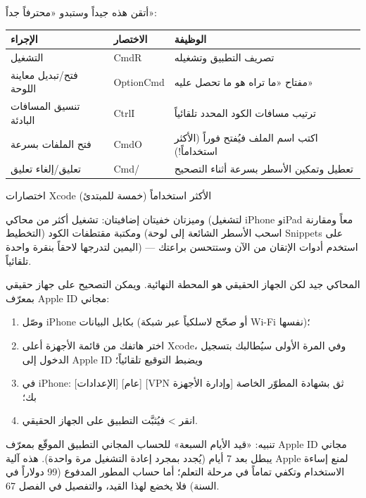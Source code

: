 

أتقن هذه جيداً وستبدو «محترفاً جداً»:

\begin{center}
\begin{tabularx}{\linewidth}{|X|X|X|}
\hline
\textbf{الإجراء} & \textbf{الاختصار} & \textbf{الوظيفة} \tabularnewline
\hline
التشغيل & CmdR & تصريف التطبيق وتشغيله \tabularnewline
فتح/تبديل معاينة اللوحة & OptionCmd & مفتاح «ما تراه هو ما تحصل عليه» \tabularnewline
تنسيق المسافات البادئة & CtrlI & ترتيب مسافات الكود المحدد تلقائياً \tabularnewline
فتح الملفات بسرعة & CmdO & اكتب اسم الملف فيُفتح فوراً (الأكثر استخداماً!) \tabularnewline
تعليق/إلغاء تعليق & Cmd/ & تعطيل وتمكين الأسطر بسرعة أثناء التصحيح \tabularnewline
\hline
\end{tabularx}
\end{center}

\begin{center}\small\color{gray}اختصارات Xcode الأكثر استخداماً (خمسة للمبتدئ)\end{center}

وميزتان خفيتان إضافيتان: تشغيل أكثر من محاكي (لتشغيل iPhone وiPad معاً ومقارنة التخطيط) ومكتبة مقتطفات الكود (اسحب الأسطر الشائعة إلى لوحة Snippets على اليمين لتدرجها لاحقاً بنقرة واحدة) — استخدم أدوات الإتقان من الآن وستتحسن براعتك تلقائياً.


المحاكي جيد لكن الجهاز الحقيقي هو المحطة النهائية. ويمكن التصحيح على جهاز حقيقي بمعرّف Apple ID مجاني:

\begin{enumerate}
  \item وصّل iPhone بكابل البيانات (أو صحّح لاسلكياً عبر شبكة Wi-Fi نفسها)؛
  \item اختر هاتفك من قائمة الأجهزة أعلى Xcode، وفي المرة الأولى سيُطالبك بتسجيل الدخول إلى Apple ID ويضبط التوقيع تلقائياً؛
  \item في iPhone: [الإعدادات] [عام] [VPN وإدارة الأجهزة] ثق بشهادة المطوّر الخاصة بك؛
  \item انقر > فيُثبَّت التطبيق على الجهاز الحقيقي.
\end{enumerate}

\begin{tcbwarn}{تنبيه: «قيد الأيام السبعة» للحساب المجاني}
التطبيق الموقّع بمعرّف Apple ID مجاني يبطل بعد 7 أيام (يُجدد بمجرد إعادة التشغيل مرة واحدة). هذه آلية Apple لمنع إساءة الاستخدام وتكفي تماماً في مرحلة التعلم؛ أما حساب المطور المدفوع (99 دولاراً في السنة) فلا يخضع لهذا القيد، والتفصيل في الفصل 67.

\end{tcbwarn}


